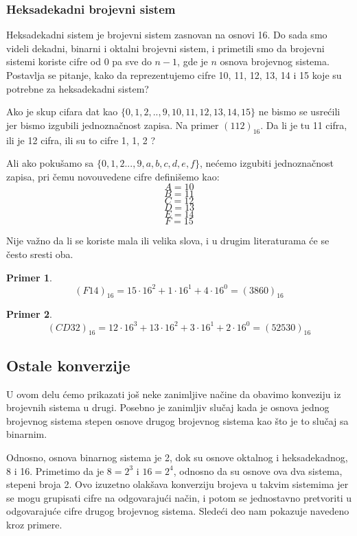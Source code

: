 \documentclass[a4paper]{article}
\newtheorem{primer}{Primer}[section]
\begin{document}
\subsubsection{Heksadekadni brojevni sistem}
Heksadekadni sistem je brojevni sistem zasnovan na osnovi 16. Do sada smo videli dekadni, binarni i oktalni brojevni sistem, i primetili smo da brojevni sistemi koriste cifre od $0$ pa sve do $n-1$, 
gde je $n$ osnova brojevnog sistema. Postavlja se pitanje, kako da reprezentujemo cifre 10, 11, 12, 13, 14 i 15 koje su potrebne za heksadekadni sistem?

Ako je skup cifara dat kao $ \{0,1,2,..,9,10,11,12,13,14,15\} $ ne bismo se usrećili jer bismo izgubili jednoznačnost zapisa. 
Na primer $ (112)_{16} $. Da li je tu 11 cifra, ili je 12 cifra, ili su to cifre 1, 1, 2 ?

Ali ako pokušamo sa $ \{0,1,2...,9,a,b,c,d,e,f \} $, nećemo izgubiti jednoznačnost zapisa, pri čemu novouvedene cifre definišemo kao: \\
$$ A = 10 $$
$$ B = 11 $$
$$ C = 12 $$
$$ D = 13 $$
$$ E = 14 $$
$$ F = 15 $$

Nije važno da li se koriste mala ili velika slova, i u drugim literaturama će se često sresti oba.

\begin{primer}
 $$ (F14)_{16} = 15\cdot16^2+1\cdot16^1+4\cdot16^0 = (3860)_{16}$$
\end{primer}

\begin{primer}
 $$ (CD32)_{16} = 12\cdot16^3+13\cdot16^2+3\cdot16^1+2\cdot16^0 = (52530)_{16}$$
\end{primer}

\subsection{Ostale konverzije}
U ovom delu ćemo prikazati još neke zanimljive načine da obavimo konveziju iz brojevnih sistema u drugi. Posebno je zanimljiv slučaj kada je osnova jednog brojevnog sistema stepen
osnove drugog brojevnog sistema kao što je to slučaj sa binarnim.

Odnosno, osnova binarnog sistema je 2, dok su osnove oktalnog i heksadekadnog, 8 i 16. Primetimo da je $8=2^3$ i $16=2^4$, odnosno da su osnove ova dva sistema, stepeni broja 2. 
Ovo izuzetno olakšava konverziju brojeva u takvim sistemima jer se mogu grupisati cifre na odgovarajući način, i potom se jednostavno pretvoriti u odgovarajuće cifre drugog brojevnog sistema.
Sledeći deo nam pokazuje navedeno kroz primere.
\end{document}
